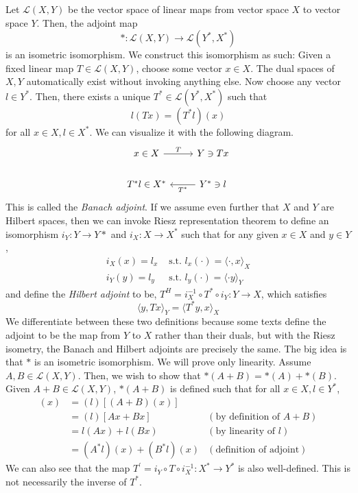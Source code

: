 	Let $\mathcal{L}(X, Y)$ be the vector space of linear maps from vector space $X$ to vector space $Y$. Then, the adjoint map 
	\begin{equation}
	  \ast : \mathcal{L}(X, Y) \to \mathcal{L}(Y^*, X^*)
	\end{equation}
	is an isometric isomorphism. We construct this isomorphism as such: Given a fixed linear map $T \in \mathcal{L}(X, Y)$, choose some vector $x \in X$. The dual spaces of $X, Y$ automatically exist without invoking anything else. Now choose any vector $l \in Y^*$. Then, there exists a unique $T^* \in \mathcal{L}(Y^*, X^*)$ such that 
	\begin{equation}
	  l (Tx) = (T^* l) (x)
	\end{equation}
	for all $x \in X, l \in X^*$. We can visualize it with the following diagram. 
	\begin{equation}
	  \begin{tikzcd}
	  	x \in X \arrow{r}{T} & Y \ni Tx \\
	  	T^* l \in X^* & \arrow{l}{T^*} Y^* \ni l
	  	\end{tikzcd}
	\end{equation}
	This is called the \textit{Banach adjoint}. If we assume even further that $X$ and $Y$ are Hilbert spaces, then we can invoke Riesz representation theorem to define an isomorphism $i_Y: Y \rightarrow Y*$ and $i_X: X \rightarrow X^*$ such that for any given $x \in X$ and $y \in Y$, 
	\begin{align*}
			i_X (x) = l_x & \text{ s.t. } l_x (\cdot) = \langle \cdot, x \rangle_X \\ 
			i_Y (y) = l_y & \text{ s.t. } l_y (\cdot) = \langle \cdot y \rangle_Y 
	\end{align*}
	and define the \textit{Hilbert adjoint} to be, $T^H = i_X^{-1} \circ T^* \circ i_Y: Y \to X$, which satisfies 
	\begin{equation}
	  \langle y, Tx \rangle_Y = \langle T^* y, x \rangle_X
	\end{equation}
	We differentiate between these two definitions because some texts define the adjoint to be the map from $Y$ to $X$ rather than their duals, but with the Riesz isometry, the Banach and Hilbert adjoints are precisely the same. The big idea is that $\ast$ is an isometric isomorphism. We will prove only linearity. Assume $A, B \in \mathcal{L}(X, Y)$. Then, we wish to show that $\ast(A + B) = \ast(A) + \ast(B)$. Given $A + B \in \mathcal{L}(X, Y)$, $\ast(A + B)$ is defined such that for all $x \in X, l \in Y^*$, 
	\begin{align*}
			[ (A + B)^* (l) ] (x) & = (l) [(A + B)(x)] \\
			& = (l) [A x + Bx] & (\text{by definition of } A + B) \\ 
			& = l(Ax) + l(Bx) & (\text{by linearity of } l) \\
			& = (A^* l)(x) + (B^* l)(x) & (\text{definition of adjoint}) 
	\end{align*}
	We can also see that the map $T^\prime = i_Y \circ T \circ i_X^{-1} : X^* \to Y^*$ is also well-defined. This is not necessarily the inverse of $T^*$. 

